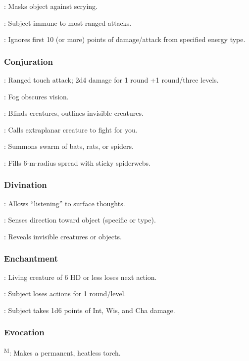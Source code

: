 	: Masks object against scrying.

	: Subject immune to most ranged attacks.

	: Ignores first 10 (or more) points of damage/attack from specified energy type.

\subsubsection{Conjuration}
	: Ranged touch attack; 2d4 damage for 1 round +1 round/three levels.

	: Fog obscures vision.

	: Blinds creatures, outlines invisible creatures.

	: Calls extraplanar creature to fight for you.

	: Summons swarm of bats, rats, or spiders.

	: Fills 6-m-radius spread with sticky spiderwebs.

\subsubsection{Divination}
	: Allows “listening” to surface thoughts.

	: Senses direction toward object (specific or type).

	: Reveals invisible creatures or objects.

\subsubsection{Enchantment}
	: Living creature of 6 HD or less loses next action.

	: Subject loses actions for 1 round/level.

	: Subject takes 1d6 points of Int, Wis, and Cha damage.

\subsubsection{Evocation}
	\textsuperscript{M}: Makes a permanent, heatless torch.

